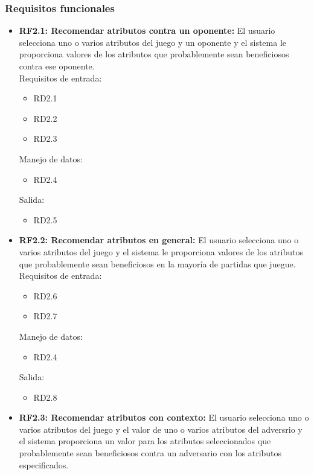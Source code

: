 \subsubsection{Requisitos funcionales}

	\begin{itemize}
		\item \textbf{RF2.1: Recomendar atributos contra un oponente:}
			El usuario selecciona uno o varios atributos del juego y un
			oponente y el sistema le proporciona valores de los
			atributos que probablemente sean beneficiosos contra ese oponente.\\

			Requisitos de entrada:
			\begin{itemize}
				\item RD2.1 %
				\item RD2.2 %
				\item RD2.3 %
			\end{itemize}
			Manejo de datos:
			\begin{itemize}
				\item RD2.4 %
			\end{itemize}
			Salida:
			\begin{itemize}
				\item RD2.5 %
			\end{itemize}

		\item \textbf{RF2.2: Recomendar atributos en general:}
			El usuario selecciona uno o varios atributos del juego
			y el sistema le proporciona valores de los atributos
			que probablemente sean beneficiosos en la mayoría
			de partidas que juegue.\\

			Requisitos de entrada:
			\begin{itemize}
				\item RD2.6 %
				\item RD2.7 %
			\end{itemize}
			Manejo de datos:
			\begin{itemize}
				\item RD2.4 %
			\end{itemize}
			Salida:
			\begin{itemize}
				\item RD2.8 %
			\end{itemize}

		\item \textbf{RF2.3: Recomendar atributos con contexto:}
			El usuario selecciona uno o varios atributos del juego y
			el valor de uno o varios atributos del adversrio y el sistema
			proporciona un valor para los atributos seleccionados que
			probablemente sean beneficiosos contra un adversario con
			los atributos especificados.\\


\end{itemize}
